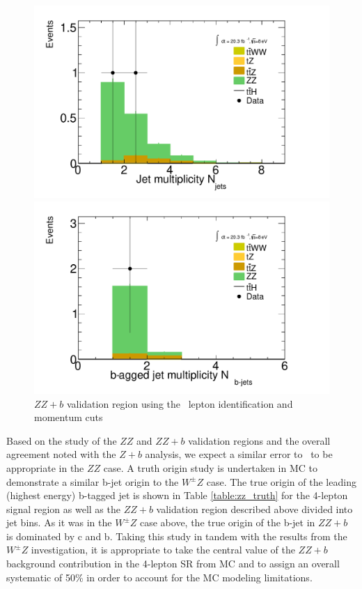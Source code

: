 \begin{figure}[htbp]
  \begin{minipage}[h]{0.5\textwidth}
    \centering \includegraphics[width=\textwidth]{figs/WZ/zz_b_NJet}
  \end{minipage}\hfill
  \begin{minipage}[h]{0.5\textwidth}
    \centering \includegraphics[width=\textwidth]{figs/WZ/zz_b_NJetBTag}
  \end{minipage}\hfill
        \caption{$ZZ+b$ validation region using the \tth\ lepton identification and momentum cuts }
        \label{figure:background_zz_z_b}
\end{figure}
 
Based on the study of the $ZZ$ and $ZZ+b$ validation regions and the overall agreement noted with the $Z+b$ analysis, we expect a similar error to \WZ\ to be appropriate in the $ZZ$ case.  A truth origin study is undertaken in MC to demonstrate a similar b-jet origin to the $W^{\pm}Z$ case. The true origin of the leading (highest energy) b-tagged jet is shown in Table \ref{table:zz_truth} for the 4-lepton signal region as well as the $ZZ+b$ validation region described above divided into jet bins. As it was in the $W^{\pm}Z$ case above, the true origin of the b-jet in $ZZ+b$ is dominated by c and b. Taking this study in tandem with the results from the $W^{\pm}Z$ investigation, it is appropriate to take the central value of the $ZZ+b$ background contribution in the 4-lepton SR from MC and to assign an overall systematic of 50\% in order to account for the MC modeling limitations. 


